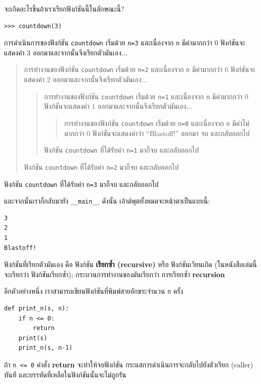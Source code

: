 จะเกิดอะไรขึ้นถ้าเราเรียกฟังก์ชันนี้ในลักษณะนี้?

\begin{verbatim}
>>> countdown(3)
\end{verbatim}
%
การดำเนินการของฟังก์ชัน {\tt countdown} เริ่มด้วย {\tt n=3} และเนื่องจาก {\tt n} มีค่ามากกว่า 0
ฟังก์ชันจะแสดงค่า 3 ออกมาและจากนั้นจึงเรียกตัวมันเอง...


\begin{quote}
การทำงานของฟังก์ชัน {\tt countdown} เริ่มด้วย {\tt n=2} และเนื่องจาก {\tt n} มีค่ามากกว่า 0
ฟังก์ชันจะแสดงค่า 2 ออกมาและจากนั้นจึงเรียกตัวมันเอง...

\begin{quote}
การทำงานของฟังก์ชัน {\tt countdown} เริ่มด้วย {\tt n=1} และเนื่องจาก {\tt n} มีค่ามากกว่า 0
ฟังก์ชันจะแสดงค่า 1 ออกมาและจากนั้นจึงเรียกตัวมันเอง...

\begin{quote}
การทำงานของฟังก์ชัน {\tt countdown} เริ่มด้วย {\tt n=0} และเนื่องจาก {\tt n} มีค่าไม่มากกว่า 0
ฟังก์ชันจะแสดงคำว่า ``Blastoff!'' ออกมา จบ และกลับออกไป
\end{quote}

ฟังก์ชัน {\tt countdown} ที่ได้รับค่า {\tt n=1} มาก็จบ และกลับออกไป
\end{quote}

ฟังก์ชัน {\tt countdown} ที่ได้รับค่า {\tt n=2} มาก็จบ และกลับออกไป
\end{quote}

ฟังก์ชัน {\tt countdown} ที่ได้รับค่า {\tt n=3} มาก็จบ และกลับออกไป

และจากนั้นเราก็กลับมายัง \verb"__main__"  ดังนั้น เอ้าต์พุตทั้งหมดจะหน้าตาเป็นแบบนี้:

\begin{verbatim}
3
2
1
Blastoff!
\end{verbatim}
% 
ฟังก์ชันที่เรียกตัวมันเอง คือ ฟังก์ชัน {\bf เรียกซ้ำ (recursive)} หรือ ฟังก์ชันเวียนเกิด (ในหนังสือเล่มนี้
จะเรียกว่า ฟังก์ชันเรียกซ้ำ); กระบวนการทำงานของมันเรียกว่า การเรียกซ้ำ {\bf recursion}

อีกตัวอย่างหนึ่ง เราสามารถเขียนฟังก์ชันที่พิมพ์สายอักขระจำนวน {\tt n} ครั้ง

\begin{verbatim}
def print_n(s, n):
    if n <= 0:
        return
    print(s)
    print_n(s, n-1)
\end{verbatim}
%
ถ้า {\tt n <= 0} คำสั่ง {\bf return} จะทำให้จบฟังก์ชัน กระแสการดำเนินการจะกลับไปยังตัวเรียก (caller) ทันที
และบรรทัดที่เหลือในฟังก์ชันนั้นจะไม่ถูกรัน

